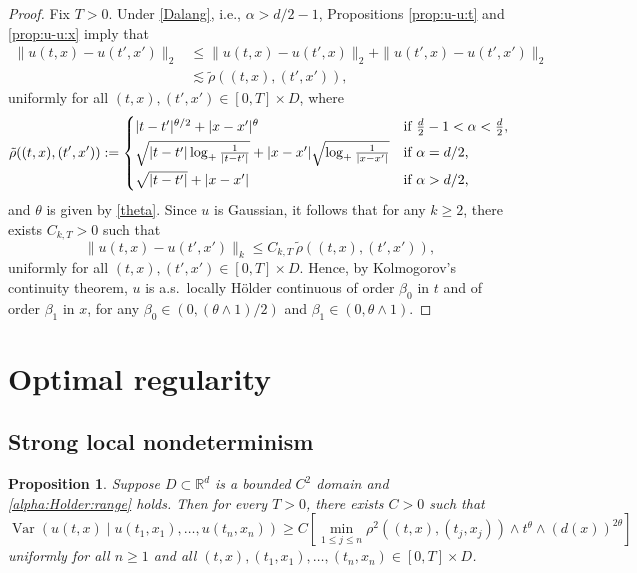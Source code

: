\documentclass[reqno]{amsart}
\DeclareMathOperator{\Var}{Var}
\newcommand{\R}{\mathbb R}
\newcommand{\1}{\mathbf 1}
\numberwithin{equation}{section}
\newtheorem{proposition}[theorem]{Proposition}
\theoremstyle{definition}
\begin{document}
\begin{proof}
Fix $T>0$.
Under \eqref{Dalang}, i.e., $\alpha>d/2-1$,
Propositions \ref{prop:u-u:t} and \ref{prop:u-u:x} imply that
\begin{align*}
	\|u(t,x)-u(t',x')\|_2
	&\le \|u(t,x)-u(t',x)\|_2 + \|u(t',x)-u(t',x')\|_2\\
	& \lesssim \tilde\rho((t,x),(t',x')),
\end{align*}
uniformly for all $(t,x),(t',x') \in [0,T]\times D$, where 
\[
	\tilde\rho((t,x),(t',x')) :=
	\begin{cases}
	|t-t'|^{\theta/2} + |x-x'|^\theta & \text{if $\frac{d}{2}-1 < \alpha < \frac{d}{2}$,}\smallskip\\
	\sqrt{|t-t'| \log_+\frac{1}{|t-t'|}} + |x-x'|\sqrt{\log_+\frac{1}{|x-x'|}} & \text{if $\alpha=d/2$,}\smallskip\\
	\sqrt{|t-t'|} + |x-x'| & \text{if $\alpha>d/2$,}
	\end{cases}
\]
and $\theta$ is given by \eqref{theta}.
Since $u$ is Gaussian, it follows that for any $k \ge 2$, there exists $C_{k,T} >0$ such that
\[
	\|u(t,x)-u(t',x')\|_k \le C_{k,T} \,\tilde\rho((t,x),(t',x')),
\]
uniformly for all $(t,x),(t',x') \in [0,T]\times D$.
Hence, by Kolmogorov's continuity theorem, $u$ is a.s.~locally H\"older continuous of order $\beta_0$ in $t$ and of order $\beta_1$ in $x$, for any $\beta_0 \in (0,(\theta\wedge 1)/2)$ and $\beta_1 \in (0,\theta\wedge 1)$.
\end{proof}

\section{Optimal regularity}\label{s:optimal}

\subsection{Strong local nondeterminism}


\begin{proposition}\label{prop:SLND}
Suppose \(D\subset\R^d\) is a bounded \(C^2\) domain and \eqref{alpha:Holder:range} holds. Then for every \(T>0\), there exists \(C>0\) such that
\[
    \Var\left(
        u(t,x)\mid u(t_1,x_1),\ldots,u(t_n,x_n)
    \right)
    \ge
    C\left[
        \min_{1\le j\le n}
        \rho^2((t,x),(t_j,x_j))
        \wedge t^{\theta}
        \wedge (d(x))^{2\theta}
    \right]
\]
uniformly for all \(n\ge1\) and all \((t,x),(t_1,x_1),\dots,(t_n,x_n)\in[0,T]\times D\).
\end{proposition}
\end{document}
